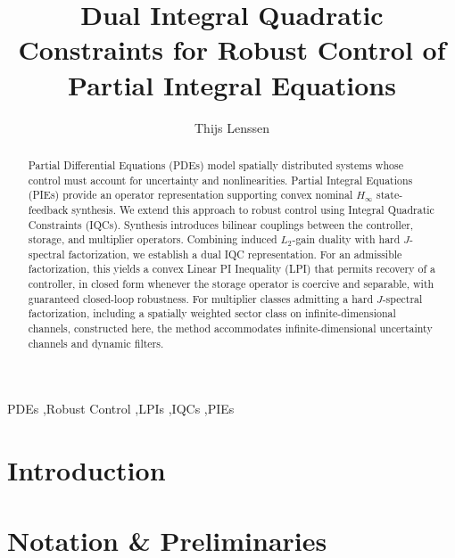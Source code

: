 \documentclass[final,5p,twocolumn]{elsarticle}
\begin{document}
\begin{frontmatter}

\title{Dual Integral Quadratic Constraints for Robust Control of Partial Integral Equations}

\author{Thijs Lenssen}
\address{Control Systems Group, Eindhoven University of Technology, The Netherlands}


\begin{abstract}
Partial Differential Equations (PDEs) model spatially distributed systems
whose control must account for uncertainty and nonlinearities. Partial
Integral Equations (PIEs) provide an operator representation supporting
convex nominal $H_\infty$ state-feedback synthesis. We extend this approach
to robust control using Integral Quadratic Constraints (IQCs). Synthesis
introduces bilinear couplings between the controller, storage, and
multiplier operators. Combining induced $L_2$-gain duality with hard $J$-spectral
factorization, we establish a dual IQC representation. For an admissible factorization, 
this yields a convex Linear PI Inequality (LPI) that permits 
recovery of a controller, in closed form whenever the storage operator is coercive
and separable, with guaranteed closed-loop robustness. For multiplier classes
admitting a hard $J$-spectral factorization, including a spatially weighted sector
class on infinite-dimensional channels, constructed here, the method accommodates
infinite-dimensional uncertainty channels and dynamic filters.
\end{abstract}

\begin{keyword}
PDEs \sep Robust Control \sep LPIs \sep IQCs \sep PIEs
\end{keyword}

\end{frontmatter}

\section{Introduction}


\section{Notation \& Preliminaries}\label{sec:preliminaries}

\end{document}
